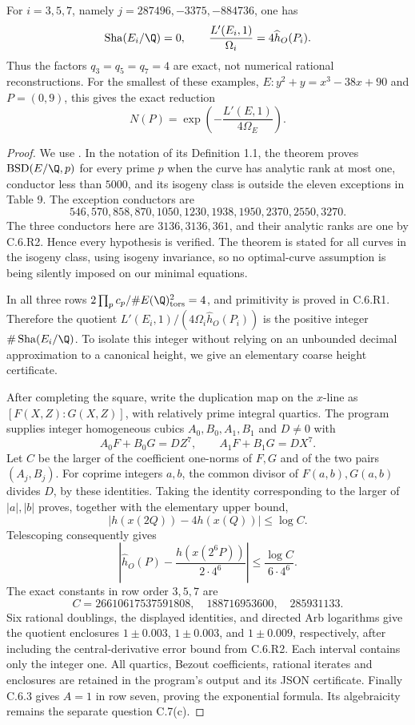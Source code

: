 \begin{statement}
For $i=3,5,7$, namely $j=287496,-3375,-884736$, one has
\[
 \operatorname{Sha}(E_i/\Q)=0,\qquad
 \frac{L'(E_i,1)}{\Omega_i}=4\widehat h_O(P_i).
\]
Thus the factors $q_3=q_5=q_7=4$ are exact, not numerical
rational reconstructions. For the smallest of these examples,
$E:y^2+y=x^3-38x+90$ and $P=(0,9)$, this gives the exact
reduction
\[
 N(P)=\exp\left(-\frac{L'(E,1)}{4\Omega_E}\right).
\]
\end{statement}
\begin{proof}
We use \citet[Theorem 1.2 and Table 9]{miller2011}. In the
notation of its Definition 1.1, the theorem proves
$\mathrm{BSD}(E/\Q,p)$ for every prime $p$ when the curve has
analytic rank at most one, conductor less than $5000$, and
its isogeny class is outside the eleven exceptions in Table 9.
The exception conductors are
\[
546,570,858,870,1050,1230,1938,1950,2370,2550,3270.
\]
The three conductors here are $3136,3136,361$, and their
analytic ranks are one by C.6.R2. Hence every hypothesis is
verified. The theorem is stated for all curves in the isogeny
class, using isogeny invariance, so no optimal-curve assumption
is being silently imposed on our minimal equations.

In all three rows
$2\prod_pc_p/\#E(\Q)_{\rm tors}^2=4$, and primitivity is
proved in C.6.R1. Therefore the quotient
$L'(E_i,1)/(4\Omega_i\widehat h_O(P_i))$ is the positive
integer $\#\operatorname{Sha}(E_i/\Q)$. To isolate this integer
without relying on an unbounded decimal approximation to a
canonical height, we give an elementary coarse height certificate.

After completing the square, write the duplication map on the
$x$-line as $[F(X,Z):G(X,Z)]$, with relatively prime integral
quartics. The program
 supplies integer
homogeneous cubics $A_0,B_0,A_1,B_1$ and $D\ne0$ with
\[
 A_0F+B_0G=DZ^7,\qquad A_1F+B_1G=DX^7.
\]
Let $C$ be the larger of the coefficient one-norms of $F,G$
and of the two pairs $(A_j,B_j)$. For coprime integers $a,b$,
the common divisor of $F(a,b),G(a,b)$ divides $D$, by these
identities. Taking the identity corresponding to the larger
of $|a|,|b|$ proves, together with the elementary upper bound,
\[
 |h(x(2Q))-4h(x(Q))|\leq\log C.
\]
Telescoping consequently gives
\[
 \left|\widehat h_O(P)-\frac{h(x(2^6P))}{2\cdot4^6}\right|
 \leq\frac{\log C}{6\cdot4^6}.
\]
The exact constants in row order $3,5,7$ are
\[
 C=26610617537591808,\quad188716953600,\quad285931133.
\]
Six rational doublings, the displayed identities, and directed
Arb logarithms give the quotient enclosures
$1\pm0.003$, $1\pm0.003$, and $1\pm0.009$, respectively,
after including the central-derivative error bound from C.6.R2.
Each interval contains only the integer one. All quartics,
Bezout coefficients, rational iterates and enclosures are
retained in the program's output and its JSON certificate.
Finally C.6.3 gives $A=1$ in row seven, proving the exponential
formula. Its algebraicity remains the separate question C.7(c).
\end{proof}
